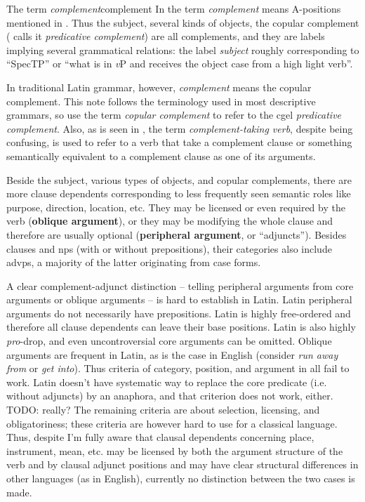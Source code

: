 \documentclass[a4paper, oneside]{report}
\newcommand*{\citesec}[1]{\S~{#1}}
\newcommand*{\concept}[1]{\textbf{#1}}
\newcommand*{\term}[1]{\emph{#1}}
\newcommand{\form}[1]{\emph{#1}}
\newcommand{\vP}{\textit{v}P}
\begin{document}
\begin{infobox}{The term \term{complement}}{complement}
    In \citet{cgel} the term \term{complement} 
    means A-positions mentioned in .
    Thus the subject, several kinds of objects,
    the copular complement (\cite{cgel} calls it \term{predicative complement}) are all complements,
    and they are labels implying several grammatical relations:
    the label \term{subject} roughly corresponding to ``SpecTP'' or ``what is in \vP{} 
    and receives the object case from a high light verb''.

    In traditional Latin grammar, however, \term{complement} means the copular complement. 
    This note follows the terminology used in most descriptive grammars,
    so use the term \term{copular complement} to refer to the \ac{cgel} \term{predicative complement}.
    Also, as is seen in , 
    the term \term{complement-taking verb}, despite being confusing,
    is used to refer to a verb that take a complement clause 
    or something semantically equivalent to a complement clause
    as one of its arguments.
\end{infobox}

Beside the subject, various types of objects, and copular complements,
there are more clause dependents
corresponding to less frequently seen semantic roles 
like purpose, direction, location, etc.
They may be licensed or even required by the verb 
(\concept{oblique argument}),
or they may be modifying the whole clause and therefore are usually optional 
(\concept{peripheral argument}, or ``adjuncts'').
Besides clauses and \ac{np}s (with or without prepositions),
their categories also include \ac{advp}s,
a majority of the latter originating from case forms.

A clear complement-adjunct distinction 
-- telling peripheral arguments from core arguments or oblique arguments --
is hard to establish in Latin.
Latin peripheral arguments do not necessarily have prepositions.
Latin is highly free-ordered and therefore all clause dependents 
can leave their base positions.
Latin is also highly \term{pro}-drop,
and even uncontroversial core arguments can be omitted.
Oblique arguments are frequent in Latin,
as is the case in English 
(consider \form{run away from} or \form{get into}).
Thus criteria of category, position, and argument in \citet[\citesec{4.1.2}]{cgel} 
all fail to work.
Latin doesn't have systematic way to replace the core predicate (i.e. without adjuncts) by an anaphora,
and that criterion does not work, either. TODO: really?
The remaining criteria are about selection, licensing, and obligatoriness;
these criteria are however hard to use for a classical language. 
Thus, despite I'm fully aware that  
clausal dependents concerning place, instrument, mean, etc. 
may be licensed by both the argument structure of the verb 
and by clausal adjunct positions 
and may have clear structural differences in other languages 
(as in English), 
currently no distinction between the two cases is made.
\end{document}
